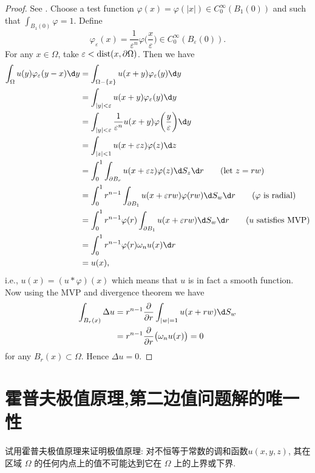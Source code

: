 \begin{proof}
  See \cite[Theorem~1.8]{han_elliptic_2011}.
  Choose a test function $\varphi(x)=\varphi(|x|)\in C_0^\infty(B_1(0))$ and such that
  $\displaystyle\int_{B_1(0)} \varphi =1$. Define
  \[ \varphi_\varepsilon(x) = \frac{1}{\varepsilon^n} \varphi\biggl(\frac{x}{\varepsilon}\biggr)
      \in C_0^\infty(B_{\varepsilon}(0)). \]
  For any $x\in\Omega$, take $\varepsilon<\operatorname{dist}(x,\partial\Omega)$. Then we have
  \begin{align*}
    \int_\Omega u(y) \varphi_\varepsilon(y-x) \d y
    & = \int_{\Omega-\{x\}} u(x+y) \varphi_\varepsilon(y) \d y \\
    & = \int_{|y|<\varepsilon} u(x+y) \varphi_\varepsilon(y) \d y \\
    & = \int_{|y|<\varepsilon} \frac{1}{\varepsilon^n} u(x+y)
        \varphi\biggl(\frac{y}{\varepsilon}\biggr) \d y \\
    & = \int_{|z|<1} u(x+\varepsilon z) \varphi(z) \d z \\
    & = \int_0^1 \int_{\partial B_r} u(x+\varepsilon z) \varphi(z) \d S_z \d r \qquad (\text{let }z=rw)\\
    & = \int_0^1 r^{n-1} \int_{\partial B_1} u(x+\varepsilon rw) \varphi(rw) \d S_w \d r
        \qquad (\varphi\ \text{is radial}) \\
    & = \int_0^1 r^{n-1} \varphi(r) \int_{\partial B_1} u(x+\varepsilon rw) \d S_w \d r
        \qquad (u\ \text{satisfies MVP}) \\
    & = \int_0^1 r^{n-1} \varphi(r) \omega_n u(x) \d r \\
    & = u(x),
  \end{align*}
  i.e., $u(x) = (u*\varphi)(x)$ which means that $u$ is in fact a smooth function.
  Now using the MVP and divergence theorem we have
  \begin{align*}
    \int_{B_r(x)} \Delta u
    & = r^{n-1} \frac{\partial}{\partial r}\int_{|w|=1} u(x+rw) \d S_w \\
    & = r^{n-1} \frac{\partial}{\partial r}\bigl(\omega_n u(x)\bigr) = 0
  \end{align*}
  for any $B_r(x)\subset\Omega$. Hence $\Delta u = 0$.
\end{proof}


\section{霍普夫极值原理,第二边值问题解的唯一性}

\begin{exercise}
  试用霍普夫极值原理来证明极值原理: 对不恒等于常数的调和函数$u(x,y,z)$,
  其在区域 $\varOmega$ 的任何内点上的值不可能达到它在 $\varOmega$ 上的上界或下界.
\end{exercise}

